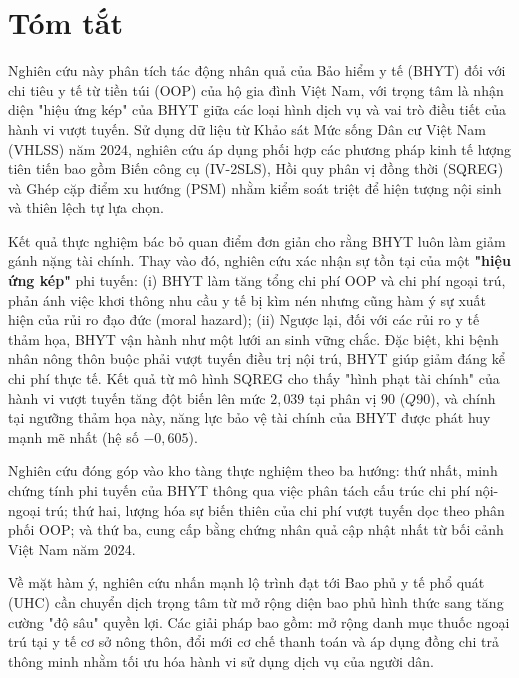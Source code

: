 \documentclass[12pt,a4paper]{article}
\begin{document}
\newpage
\section*{Tóm tắt}

Nghiên cứu này phân tích tác động nhân quả của Bảo hiểm y tế (BHYT) đối với chi tiêu y tế từ tiền túi (OOP) của hộ gia đình Việt Nam, với trọng tâm là nhận diện "hiệu ứng kép" của BHYT giữa các loại hình dịch vụ và vai trò điều tiết của hành vi vượt tuyến. Sử dụng dữ liệu từ Khảo sát Mức sống Dân cư Việt Nam (VHLSS) năm 2024, nghiên cứu áp dụng phối hợp các phương pháp kinh tế lượng tiên tiến bao gồm Biến công cụ (IV-2SLS), Hồi quy phân vị đồng thời (SQREG) và Ghép cặp điểm xu hướng (PSM) nhằm kiểm soát triệt để hiện tượng nội sinh và thiên lệch tự lựa chọn.

Kết quả thực nghiệm bác bỏ quan điểm đơn giản cho rằng BHYT luôn làm giảm gánh nặng tài chính. Thay vào đó, nghiên cứu xác nhận sự tồn tại của một \textbf{"hiệu ứng kép"} phi tuyến: (i) BHYT làm tăng tổng chi phí OOP và chi phí ngoại trú, phản ánh việc khơi thông nhu cầu y tế bị kìm nén nhưng cũng hàm ý sự xuất hiện của rủi ro đạo đức (moral hazard); (ii) Ngược lại, đối với các rủi ro y tế thảm họa, BHYT vận hành như một lưới an sinh vững chắc. Đặc biệt, khi bệnh nhân nông thôn buộc phải vượt tuyến điều trị nội trú, BHYT giúp giảm đáng kể chi phí thực tế. Kết quả từ mô hình SQREG cho thấy "hình phạt tài chính" của hành vi vượt tuyến tăng đột biến lên mức $2,039$ tại phân vị 90 ($Q90$), và chính tại ngưỡng thảm họa này, năng lực bảo vệ tài chính của BHYT được phát huy mạnh mẽ nhất (hệ số $-0,605$).

Nghiên cứu đóng góp vào kho tàng thực nghiệm theo ba hướng: thứ nhất, minh chứng tính phi tuyến của BHYT thông qua việc phân tách cấu trúc chi phí nội-ngoại trú; thứ hai, lượng hóa sự biến thiên của chi phí vượt tuyến dọc theo phân phối OOP; và thứ ba, cung cấp bằng chứng nhân quả cập nhật nhất từ bối cảnh Việt Nam năm 2024. 

Về mặt hàm ý, nghiên cứu nhấn mạnh lộ trình đạt tới Bao phủ y tế phổ quát (UHC) cần chuyển dịch trọng tâm từ mở rộng diện bao phủ hình thức sang tăng cường "độ sâu" quyền lợi. Các giải pháp bao gồm: mở rộng danh mục thuốc ngoại trú tại y tế cơ sở nông thôn, đổi mới cơ chế thanh toán và áp dụng đồng chi trả thông minh nhằm tối ưu hóa hành vi sử dụng dịch vụ của người dân.
\end{document}
